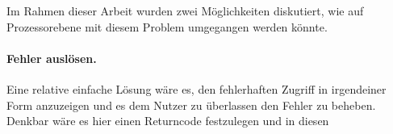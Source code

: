 Im Rahmen dieser Arbeit wurden zwei Möglichkeiten diskutiert, wie auf Prozessorebene mit diesem Problem umgegangen werden könnte.

\paragraph{Fehler auslösen.}
Eine relative einfache Lösung wäre es, den fehlerhaften Zugriff in irgendeiner Form anzuzeigen und es dem Nutzer zu überlassen den Fehler zu beheben.
Denkbar wäre es hier einen Returncode festzulegen und in diesen 




\iffalse
- den Zugriff auflösen zu Byte-Zugriff -> sehr langsam
- mit compiler von vornherein unterbinden
- return code
\fi


